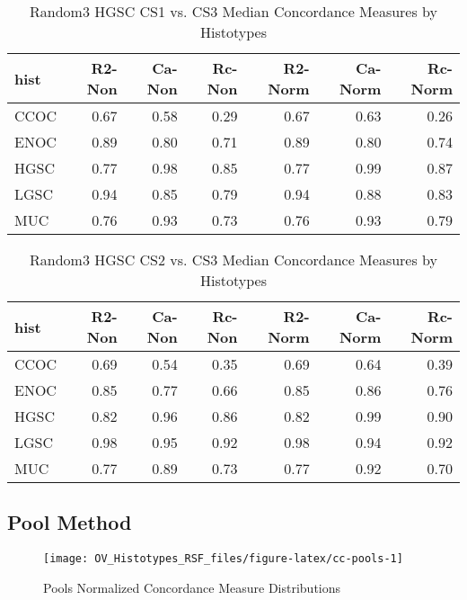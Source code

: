 \documentclass[
]{report}
\begin{document}
\begin{table}

\caption{\label{tab:rand3-hgsc-cs1-vs-cs3}Random3 HGSC CS1 vs. CS3 Median Concordance Measures by Histotypes}
\centering
\begin{tabular}[t]{l|r|r|r|r|r|r}
\hline
hist & R2-Non & Ca-Non & Rc-Non & R2-Norm & Ca-Norm & Rc-Norm\\
\hline
CCOC & 0.67 & 0.58 & 0.29 & 0.67 & 0.63 & 0.26\\
\hline
ENOC & 0.89 & 0.80 & 0.71 & 0.89 & 0.80 & 0.74\\
\hline
HGSC & 0.77 & 0.98 & 0.85 & 0.77 & 0.99 & 0.87\\
\hline
LGSC & 0.94 & 0.85 & 0.79 & 0.94 & 0.88 & 0.83\\
\hline
MUC & 0.76 & 0.93 & 0.73 & 0.76 & 0.93 & 0.79\\
\hline
\end{tabular}
\end{table}

\begin{table}

\caption{\label{tab:rand3-hgsc-cs2-vs-cs3}Random3 HGSC CS2 vs. CS3 Median Concordance Measures by Histotypes}
\centering
\begin{tabular}[t]{l|r|r|r|r|r|r}
\hline
hist & R2-Non & Ca-Non & Rc-Non & R2-Norm & Ca-Norm & Rc-Norm\\
\hline
CCOC & 0.69 & 0.54 & 0.35 & 0.69 & 0.64 & 0.39\\
\hline
ENOC & 0.85 & 0.77 & 0.66 & 0.85 & 0.86 & 0.76\\
\hline
HGSC & 0.82 & 0.96 & 0.86 & 0.82 & 0.99 & 0.90\\
\hline
LGSC & 0.98 & 0.95 & 0.92 & 0.98 & 0.94 & 0.92\\
\hline
MUC & 0.77 & 0.89 & 0.73 & 0.77 & 0.92 & 0.70\\
\hline
\end{tabular}
\end{table}

\hypertarget{pool-method}{%
\subsection{Pool Method}\label{pool-method}}

\begin{figure}[H]

{\centering \texttt{[image: OV\_Histotypes\_RSF\_files/figure-latex/cc-pools-1]} 

}

\caption{Pools Normalized Concordance Measure Distributions}\label{fig:cc-pools}
\end{figure}
\end{document}
